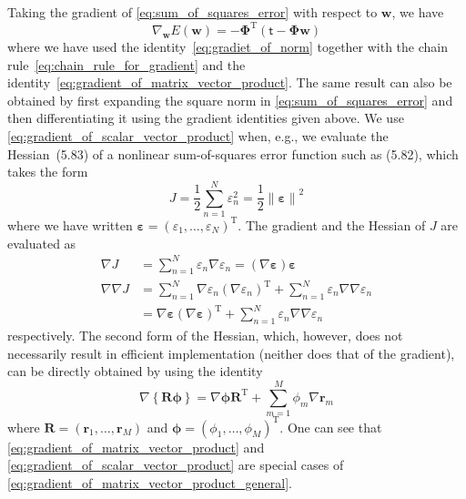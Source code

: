 \documentclass[12pt,a4paper]{article}
\begin{document}
Taking the gradient of \eqref{eq:sum_of_squares_error} with respect to $\mathbf{w}$, we have
\begin{equation}
\nabla_{\mathbf{w}} E(\mathbf{w}) =
-\bm{\Phi}^{\operatorname{T}} \left( \bm{\mathsf{t}} - \bm{\Phi}\mathbf{w} \right)
\end{equation}
where we have used the identity~\eqref{eq:gradiet_of_norm} together with
the chain rule~\eqref{eq:chain_rule_for_gradient} and
the identity~\eqref{eq:gradient_of_matrix_vector_product}.
The same result can also be obtained by first expanding the square norm in
\eqref{eq:sum_of_squares_error} and then differentiating it using the gradient identities
given above.
We use \eqref{eq:gradient_of_scalar_vector_product}
when, e.g., we evaluate the Hessian~(5.83) of a nonlinear sum-of-squares error function
such as (5.82), which takes the form
\begin{equation}
J = \frac{1}{2} \sum_{n=1}^{N} \varepsilon_n^{2} = \frac{1}{2} \left\|\bm{\varepsilon}\right\|^2
\end{equation}
where we have written
$\bm{\varepsilon} = \left(\varepsilon_1, \dots, \varepsilon_N\right)^{\operatorname{T}}$.
The gradient and the Hessian of $J$ are evaluated as
\begin{align}
\nabla J &= \sum_{n=1}^{N} \varepsilon_n \nabla \varepsilon_n
= \left( \nabla \bm{\varepsilon} \right) \bm{\varepsilon} \\
\nabla\nabla J &= \sum_{n=1}^{N}
\nabla\varepsilon_n \left(\nabla\varepsilon_n\right)^{\operatorname{T}}
+ \sum_{n=1}^{N} \varepsilon_n \nabla\nabla \varepsilon_n \\
&= \nabla \bm{\varepsilon} \left( \nabla \bm{\varepsilon} \right)^{\operatorname{T}}
+ \sum_{n=1}^{N} \varepsilon_n \nabla\nabla \varepsilon_n
\end{align}
respectively.
The second form of the Hessian,
which, however, does not necessarily result in efficient implementation
(neither does that of the gradient),
can be directly obtained by using the identity
\begin{equation}
\nabla \left\{ \mathbf{R} \bm{\phi} \right\}
= \nabla \bm{\phi} \mathbf{R}^{\operatorname{T}} + \sum_{m=1}^{M} \phi_m \nabla \mathbf{r}_m
\label{eq:gradient_of_matrix_vector_product_general}
\end{equation}
where $\mathbf{R} = \left(\mathbf{r}_1, \dots, \mathbf{r}_M\right)$ and
$\bm{\phi} = \left(\phi_1, \dots, \phi_M\right)^{\operatorname{T}}$.
One can see that
\eqref{eq:gradient_of_matrix_vector_product} and
\eqref{eq:gradient_of_scalar_vector_product}
are special cases of
\eqref{eq:gradient_of_matrix_vector_product_general}.
\end{document}
